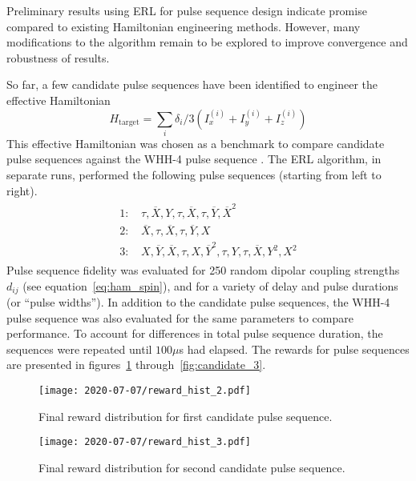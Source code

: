 \documentclass{article}
\begin{document}

Preliminary results using ERL for pulse sequence design indicate promise compared to existing Hamiltonian engineering methods. However, many modifications to the algorithm remain to be explored to improve convergence and robustness of results.

So far, a few candidate pulse sequences have been identified to engineer the effective Hamiltonian
\begin{equation}
    H_\text{target} = \sum_i \delta_i/3 (I_x^{(i)} + I_y^{(i)} + I_z^{(i)})
\end{equation}
This effective Hamiltonian was chosen as a benchmark to compare candidate pulse sequences against the WHH-4 pulse sequence \cite{PhysRevLett.20.180}. The ERL algorithm, in separate runs, performed the following pulse sequences (starting from left to right).
\begin{align}\label{eq:candidate_seq}
\begin{split}
    1: \, & \tau, \overline{X}, Y, \tau, \overline{X}, \tau, \overline{Y}, \overline{X}^2 \\
    2: \, & \overline{X}, \tau, \overline{X}, \tau, \overline{Y}, X \\
    3: \, & X, \overline{Y}, \overline{X}, \tau, X, \overline{Y}^2, \tau,
        Y, \tau, \overline{X}, Y^2, X^2
\end{split}
\end{align}
Pulse sequence fidelity was evaluated for 250 random dipolar coupling strengths $d_{ij}$ (see equation~\ref{eq:ham_spin}), and for a variety of delay and pulse durations (or ``pulse widths''). In addition to the candidate pulse sequences, the WHH-4 pulse sequence was also evaluated for the same parameters to compare performance. To account for differences in total pulse sequence duration, the sequences were repeated until $100\mu$s had elapsed. The rewards for  pulse sequences are presented in figures~\ref{fig:candidate_1} through~\ref{fig:candidate_3}.

\begin{figure}[H]
    \centering
    \texttt{[image: 2020-07-07/reward\_hist\_2.pdf]}
    \caption{Final reward distribution for first candidate pulse sequence.}
    \label{fig:candidate_1}
\end{figure}

\begin{figure}[H]
    \centering
    \texttt{[image: 2020-07-07/reward\_hist\_3.pdf]}
    \caption{Final reward distribution for second candidate pulse sequence.}
    \label{fig:candidate_2}
\end{figure}
\end{document}
